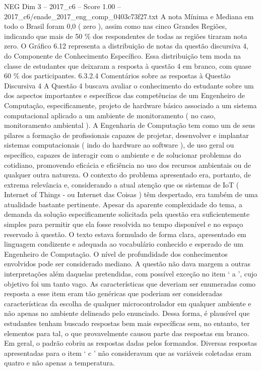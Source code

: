 \begin{textsample}{NEG Dim 3 – 2017\_c6 – Score 1.00 – 2017\_c6/enade\_2017\_eng\_comp\_0403c73f27.txt}
A nota Mínima e Mediana em todo o Brasil foram 0,0 ( zero ), assim como nas cinco Grandes Regiões, indicando que mais de 50 \% dos respondentes de todas as regiões tiraram nota zero.
O Gráfico 6.12 representa a distribuição de notas da questão discursiva 4, do Componente de Conhecimento Específico.
Essa distribuição tem moda na classe de estudantes que deixaram a resposta à questão 4 em branco, com quase 60 \% dos participantes. 6.3.2.4 Comentários sobre as respostas à Questão Discursiva 4 A Questão 4 buscava avaliar o conhecimento do estudante sobre um dos aspectos importantes e específicos das competências de um Engenheiro de Computação, especificamente, projeto de hardware básico associado a um sistema computacional aplicado a um ambiente de monitoramento ( no caso, monitoramento ambiental ).
A Engenharia de Computação tem como um de seus pilares a formação de profissionais capazes de projetar, desenvolver e implantar sistemas computacionais ( indo do hardware ao software ), de uso geral ou específico, capazes de interagir com o ambiente e de solucionar problemas do cotidiano, promovendo eficácia e eficiência no uso dos recursos ambientais ou de qualquer outra natureza.
O contexto do problema apresentado era, portanto, de extrema relevância e, considerando a atual atenção que os sistemas de IoT ( Internet of Things - ou Internet das Coisas ) têm despertado, era também de uma atualidade bastante pertinente.
Apesar da aparente complexidade do tema, a demanda da solução especificamente solicitada pela questão era suficientemente simples para permitir que ela fosse resolvida no tempo disponível e no espaço reservado à questão.
O texto estava formulado de forma clara, apresentado em linguagem condizente e adequada ao vocabulário conhecido e esperado de um Engenheiro de Computação.
O nível de profundidade dos conhecimentos envolvidos pode ser considerado mediano.
A questão não dava margem a outras interpretações além daquelas pretendidas, com possível exceção no item ‘ a ’, cujo objetivo foi um tanto vago.
As características que deveriam ser enumeradas como resposta a esse item eram tão genéricas que poderiam ser consideradas características da escolha de qualquer microcontrolador em qualquer ambiente e não apenas no ambiente delineado pelo enunciado.
Dessa forma, é plausível que estudantes tenham buscado respostas bem mais específicas sem, no entanto, ter elementos para tal, o que provavelmente causou parte das respostas em branco.
Em geral, o padrão cobriu as respostas dadas pelos formandos.
Diversas respostas apresentadas para o item ‘ c ’ não consideravam que as variáveis coletadas eram quatro e não apenas a temperatura.

\end{textsample}
